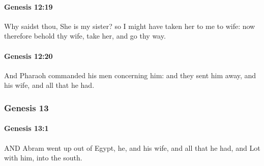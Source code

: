 		\paragraph{Genesis 12:19} %
			\label{GENESIS-12-19}

			Why saidst thou, She is my sister?  so I might have taken her to me to wife: now therefore behold thy wife, take her, and go thy way.


		\paragraph{Genesis 12:20} %
			\label{GENESIS-12-20}

			And Pharaoh commanded his men concerning him: and they sent him away, and his wife, and all that he had.


	\subsubsection{Genesis 13} %
		\label{GENESIS-13}
		
		\paragraph{Genesis 13:1} %
			\label{GENESIS-13-1}

			AND Abram went up out of Egypt, he, and his wife, and all that he had, and Lot with him, into the south.

